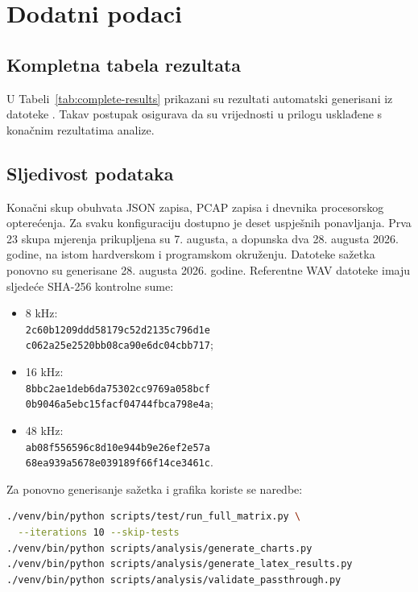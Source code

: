\chapter{Dodatni podaci}
\label{app:rezultati}

\section{Kompletna tabela rezultata}

U Tabeli~\ref{tab:complete-results} prikazani su rezultati automatski generisani iz datoteke . Takav postupak osigurava da su vrijednosti u prilogu usklađene s konačnim rezultatima analize.



\section{Sljedivost podataka}

Konačni skup obuhvata \BrojPoziva{} JSON zapisa, \BrojPoziva{} PCAP zapisa i \BrojPoziva{} dnevnika procesorskog opterećenja. Za svaku konfiguraciju dostupno je deset uspješnih ponavljanja. Prva 23 skupa mjerenja prikupljena su 7. augusta, a dopunska dva 28. augusta 2026. godine, na istom hardverskom i programskom okruženju. Datoteke sažetka ponovno su generisane 28. augusta 2026. godine. Referentne WAV datoteke imaju sljedeće SHA-256 kontrolne sume:

\begin{itemize}
    \item 8 kHz:\\
    \texttt{2c60b1209ddd58179c52d2135c796d1e}\\
    \texttt{c062a25e2520bb08ca90e6dc04cbb717};
    \item 16 kHz:\\
    \texttt{8bbc2ae1deb6da75302cc9769a058bcf}\\
    \texttt{0b9046a5ebc15facf04744fbca798e4a};
    \item 48 kHz:\\
    \texttt{ab08f556596c8d10e944b9e26ef2e57a}\\
    \texttt{68ea939a5678e039189f66f14ce3461c}.
\end{itemize}

Za ponovno generisanje sažetka i grafika koriste se naredbe:

\begin{lstlisting}[language=bash]
./venv/bin/python scripts/test/run_full_matrix.py \
  --iterations 10 --skip-tests
./venv/bin/python scripts/analysis/generate_charts.py
./venv/bin/python scripts/analysis/generate_latex_results.py
./venv/bin/python scripts/analysis/validate_passthrough.py
\end{lstlisting}

